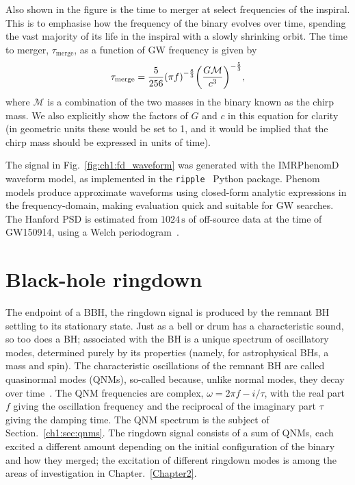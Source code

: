 Also shown in the figure is the time to merger at select frequencies of the inspiral.
This is to emphasise how the frequency of the binary evolves over time, spending the vast majority of its life in the inspiral with a slowly shrinking orbit.
The time to merger, $\tau_\mathrm{merge}$, as a function of GW frequency is given by
\begin{equation}\label{eq:time_to_merger}
    \tau_\mathrm{merge} = \frac{5}{256} \qty(\pi f)^{-\frac{8}{3}} \qty(\frac{G\mathcal{M}}{c^3})^{-\frac{5}{3}},
\end{equation}
where $\mathcal{M}$ is a combination of the two masses in the binary known as the chirp mass.
We also explicitly show the factors of $G$ and $c$ in this equation for clarity (in geometric units these would be set to 1, and it would be implied that the chirp mass should be expressed in units of time). 

The signal in Fig.~\ref{fig:ch1:fd_waveform} was generated with the IMRPhenomD~\cite{Khan:2015jqa} waveform model, as implemented in the \texttt{ripple}~\cite{Edwards:2023sak} Python package.
Phenom models produce approximate waveforms using closed-form analytic expressions in the frequency-domain, making evaluation quick and suitable for GW searches.
The Hanford PSD is estimated from $1024\,\mathrm{s}$ of off-source data at the time of GW150914, using a Welch periodogram~\cite{1161901}.


\section{Black-hole ringdown}

The endpoint of a BBH, the ringdown signal is produced by the remnant BH settling to its stationary state.
Just as a bell or drum has a characteristic sound, so too does a BH; associated with the BH is a unique spectrum of oscillatory modes, determined purely by its properties (namely, for astrophysical BHs, a mass and spin).
The characteristic oscillations of the remnant BH are called quasinormal modes (QNMs), so-called because, unlike normal modes, they decay over time~\cite{Berti:2005ys, Berti:2009kk}.
The QNM frequencies are complex, $\omega = 2\pi f - i/\tau$, with the real part $f$ giving the oscillation frequency and the reciprocal of the imaginary part $\tau$ giving the damping time. 
The QNM spectrum is the subject of Section.~\ref{ch1:sec:qnms}.
The ringdown signal consists of a sum of QNMs, each excited a different amount depending on the initial configuration of the binary and how they merged; the excitation of different ringdown modes is among the areas of investigation in Chapter.~\ref{Chapter2}.


